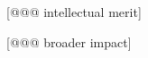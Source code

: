\documentclass[11pt,letterpaper]{article}
\begin{document}


[@@@ intellectual merit]





[@@@ broader impact]



\end{document}
